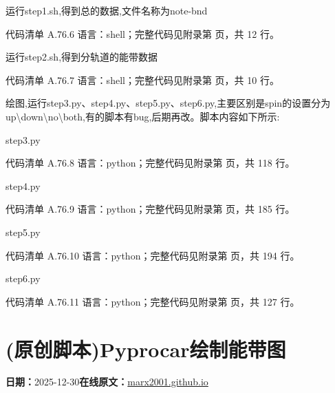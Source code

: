 \documentclass[lang=cn,scheme=chinese,color=blue,device=normal,toc=onecol,math=cm]{elegantbook}
\begin{document}
运行step1.sh,得到总的数据,文件名称为note-bnd\par


\begin{codeindexbox}{代码清单 A.76.6}
语言：shell；完整代码见附录第 \pageref{code:76:6} 页，共 12 行。
\end{codeindexbox}


运行step2.sh,得到分轨道的能带数据\par


\begin{codeindexbox}{代码清单 A.76.7}
语言：shell；完整代码见附录第 \pageref{code:76:7} 页，共 10 行。
\end{codeindexbox}


绘图,运行step3.py、step4.py、step5.py、step6.py,主要区别是spin的设置分为up\textbackslash{}\allowbreak{}down\textbackslash{}\allowbreak{}no\textbackslash{}\allowbreak{}both,有的脚本有bug,后期再改。脚本内容如下所示:\par


step3.py\par


\begin{codeindexbox}{代码清单 A.76.8}
语言：python；完整代码见附录第 \pageref{code:76:8} 页，共 118 行。
\end{codeindexbox}


step4.py\par


\begin{codeindexbox}{代码清单 A.76.9}
语言：python；完整代码见附录第 \pageref{code:76:9} 页，共 185 行。
\end{codeindexbox}


step5.py\par


\begin{codeindexbox}{代码清单 A.76.10}
语言：python；完整代码见附录第 \pageref{code:76:10} 页，共 194 行。
\end{codeindexbox}


step6.py\par


\begin{codeindexbox}{代码清单 A.76.11}
语言：python；完整代码见附录第 \pageref{code:76:11} 页，共 127 行。
\end{codeindexbox}



\section{(原创脚本)Pyprocar绘制能带图}
\begin{articlemeta}
\textbf{日期：}2025-12-30\hfill\textbf{在线原文：}\href{https://marx2001.github.io/sci-note\_posts/20251230-band}{marx2001.github.io}
\end{articlemeta}
\end{document}
